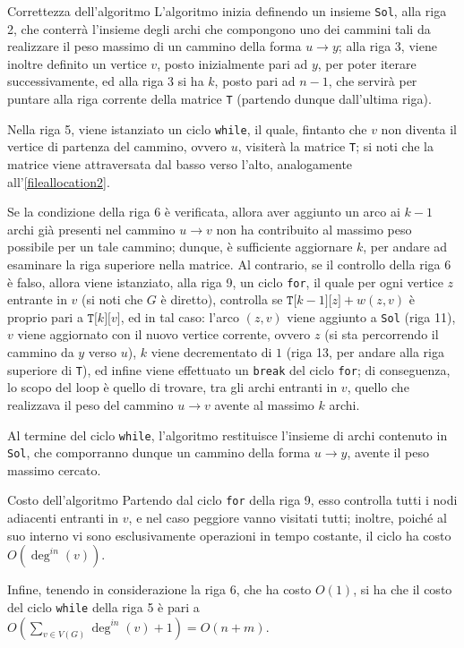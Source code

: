 \documentclass[a4paper, 12pt]{report}
\begin{document}
    \begin{framedobs}{Correttezza dell'algoritmo}
        L'algoritmo inizia definendo un insieme \texttt{Sol}, alla riga 2, che conterrà l'insieme degli archi che compongono uno dei cammini tali da realizzare il peso massimo di un cammino della forma $u \rightarrow y$; alla riga 3, viene inoltre definito un vertice $v$, posto inizialmente pari ad $y$, per poter iterare successivamente, ed alla riga 3 si ha $k$, posto pari ad $n - 1$, che servirà per puntare alla riga corrente della matrice \texttt{T} (partendo dunque dall'ultima riga).

        Nella riga 5, viene istanziato un ciclo \texttt{while}, il quale, fintanto che $v$ non diventa il vertice di partenza del cammino, ovvero $u$, visiterà la matrice \texttt{T}; si noti che la matrice viene attraversata dal basso verso l'alto, analogamente all'\cref{fileallocation2}.

        Se la condizione della riga 6 è verificata, allora aver aggiunto un arco ai $k - 1$ archi già presenti nel cammino $u \rightarrow v$ non ha contribuito al massimo peso possibile per un tale cammino; dunque, è sufficiente aggiornare $k$, per andare ad esaminare la riga superiore nella matrice. Al contrario, se il controllo della riga 6 è falso, allora viene istanziato, alla riga 9, un ciclo \texttt{for}, il quale per ogni vertice $z$ entrante in $v$ (si noti che $G$ è diretto), controlla se $\texttt{T[}k - 1\texttt{][}z\texttt{]} + w(z, v)$ è proprio pari a $\texttt{T[}k\texttt{][}v\texttt{]}$, ed in tal caso: l'arco $(z, v)$ viene aggiunto a \texttt{Sol} (riga 11), $v$ viene aggiornato con il nuovo vertice corrente, ovvero $z$ (si sta percorrendo il cammino da $y$ verso $u$), $k$ viene decrementato di $1$ (riga 13, per andare alla riga superiore di \texttt{T}), ed infine viene effettuato un \texttt{break} del ciclo \texttt{for}; di conseguenza, lo scopo del loop è quello di trovare, tra gli archi entranti in $v$, quello che realizzava il peso del cammino $u \rightarrow v$ avente al massimo $k$ archi.

        Al termine del ciclo \texttt{while}, l'algoritmo restituisce l'insieme di archi contenuto in \texttt{Sol}, che comporranno dunque un cammino della forma $u \rightarrow y$, avente il peso massimo cercato.
    \end{framedobs}

    \begin{framedobs}{Costo dell'algoritmo}
        Partendo dal ciclo \texttt{for} della riga 9, esso controlla tutti i nodi adiacenti entranti in $v$, e nel caso peggiore vanno visitati tutti; inoltre, poiché al suo interno vi sono esclusivamente operazioni in tempo costante, il ciclo ha costo $O(\deg^{in}(v))$.

        Infine, tenendo in considerazione la riga 6, che ha costo $O(1)$, si ha che il costo del ciclo \texttt{while} della riga 5 è pari a $\displaystyle O\left(\sum_{v \in V(G)}{\deg^{in}(v) + 1} \right) = O(n + m)$.
    \end{framedobs}
\end{document}
